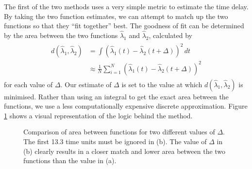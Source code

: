 \documentclass[a4paper,11pt,twoside]{article}
\begin{document}
   The first of the two methods uses a very simple metric to estimate the time
   delay. By taking the two function estimates, we can attempt to match up the
   two functions so that they ``fit together'' best. The goodness of fit can be
   determined by the area between the two functions $\hat{\lambda}_1$ and
   $\hat{\lambda}_2$, calculated by
   \begin{align}
   \begin{split}
   d(\hat{\lambda}_1,\hat{\lambda}_2)&=\int(\hat{\lambda}_1(t)-\hat{\lambda}_2(t+\Delta))^2\,dt\\
   &\approx\frac{1}{N}\sum_{i=1}^N(\hat{\lambda}_1(t)-\hat{\lambda}_2(t+\Delta))^2
   \end{split}
   \end{align}
   for each value of $\Delta$. Our estimate of $\Delta$ is set to the value at
   which $d(\hat{\lambda}_1,\hat{\lambda}_2)$ is minimised. Rather than using an
   integral to get the exact area between the functions, we use a less
   computationally expensive discrete approximation. Figure \ref{fig:areamethod}
   shows a visual representation of the logic behind the method.
   \begin{figure}[h]
   \caption{Comparison of area between functions for two different values of
   $\Delta$. The first 13.3 time units must be ignored in (b). The value of
   $\Delta$ in (b) clearly results in a closer match and lower area between the two functions
   than the value in (a).}
   \label{fig:areamethod}
   \end{figure}
\end{document}
